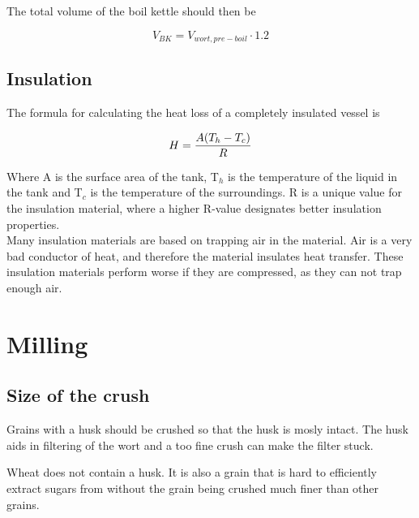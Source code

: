 \documentclass[11pt,fleqn,openany]{book} %
\begin{document}
The total volume of the boil kettle should then be

\begin{equation}
V_{BK} = V_{wort, pre-boil} \cdot 1.2
\end{equation}

\section{Insulation}

The formula for calculating the heat loss of a completely insulated vessel is

\begin{equation}
H = {{A (T_h - T_c)} \over R}
\end{equation}

Where A is the surface area of the tank, T$_h$ is the temperature of the liquid in the tank and T$_c$ is the temperature of the surroundings. R is a unique value for the insulation material, where a higher R-value designates better insulation properties.\\

Many insulation materials are based on trapping air in the material. Air is a very bad conductor of heat, and therefore the material insulates heat transfer. These insulation materials perform worse if they are compressed, as they can not trap enough air.




\chapter{Milling}

\section{Size of the crush}

Grains with a husk should be crushed so that the husk is mosly intact. The husk aids in filtering of the wort and a too fine crush can make the filter stuck.

Wheat does not contain a husk. It is also a grain that is hard to efficiently extract sugars from without the grain being crushed much finer than other grains.

\end{document}
